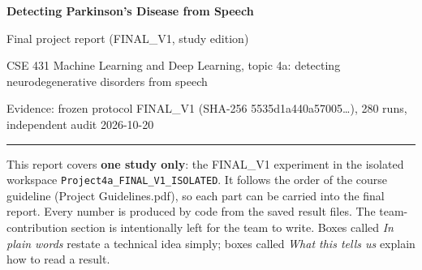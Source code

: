 \documentclass[11pt,a4paper]{article}
\begin{document}
\begin{center}{\LARGE\bfseries Detecting Parkinson's Disease from Speech\par}\vspace{6pt}
{\Large Final project report (FINAL\_V1, study edition)\par}\vspace{6pt}
{\normalsize CSE 431 Machine Learning and Deep Learning, topic 4a: detecting neurodegenerative disorders from speech\par}\vspace{3pt}
{\small Evidence: frozen protocol FINAL\_V1 (SHA-256 5535d1a440a57005\ldots), 280 runs, independent audit \textperiodcentered{} 2026-10-20\par}\end{center}
\vspace{4pt}\hrule\vspace{6pt}
\tableofcontents
\newpage
\begin{tcolorbox}[colback=gray!5,colframe=gray!60!black,boxrule=0.5pt,arc=2pt,left=5pt,right=5pt,top=3pt,bottom=3pt,title={\small\bfseries Note}]\small This report covers \textbf{one study only}: the FINAL\_V1 experiment in the isolated workspace \texttt{Project4a\_FINAL\_V1\_ISOLATED}. It follows the order of the course guideline (Project Guidelines.pdf), so each part can be carried into the final report. Every number is produced by code from the saved result files. The team-contribution section is intentionally left for the team to write. Boxes called \emph{In plain words} restate a technical idea simply; boxes called \emph{What this tells us} explain how to read a result.\end{tcolorbox}
\end{document}
